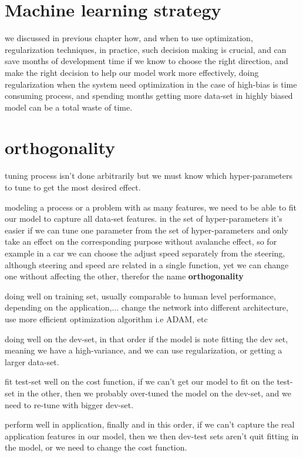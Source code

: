\documentclass[4apaper,12pt]{book}
\begin{document}
  \section{Machine learning strategy}
  \begin{description}
  \item we discussed in previous chapter how, and when to use optimization, regularization techniques, in practice, such decision making is crucial, and can save months of development time if we know to choose the right direction, and make the right decision to help our model work more effectively, doing regularization when the system need optimization in the case of high-bias is time consuming process, and spending months getting more data-set in highly biased model can be a total waste of time.
    \section{orthogonality}
  \item tuning process isn't done arbitrarily  but we must know which hyper-parameters to tune to get the most desired effect.
  \item modeling a process or a problem with as many features, we need to be able to fit our model to capture all data-set features. in the set of hyper-parameters it's easier if we can tune one parameter from the set of hyper-parameters and only take an effect on the corresponding purpose without avalanche effect, so for example in a car we can choose the adjust speed separately from the steering, although steering and speed are related in a single function, yet we can change one without affecting the other, therefor the name \textbf{orthogonality}
  \item doing well on training set, usually comparable to human level performance, depending on the application,... change the network into different architecture, use more efficient optimization algorithm i.e ADAM, etc
  \item doing well on the dev-set, in that order if the model is note fitting the dev set, meaning we have a high-variance, and we can use regularization, or getting a larger data-set.
  \item fit test-set well on the cost function, if we can't get our model to fit on the test-set in the other, then we probably over-tuned the model on the dev-set, and we need to re-tune with bigger dev-set.
  \item perform well in application, finally and in this order, if we can't capture the real application features in our model, then we then dev-test sets aren't quit fitting in the model, or we need to change the cost function.

\end{description}
\end{document}
